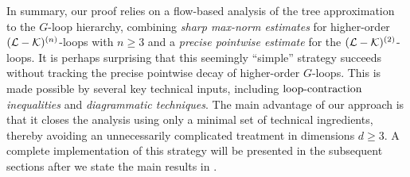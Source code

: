 In summary, our proof relies on a flow-based analysis of the tree approximation to the $G$-loop hierarchy, combining \emph{sharp max-norm estimates} for higher-order $(\mathcal L-\mathcal K)^{(n)}$-loops with $n\ge 3$ and a \emph{precise pointwise estimate} for the $(\mathcal L-\mathcal K)^{(2)}$-loops.
It is perhaps surprising that this seemingly ``simple'' strategy succeeds without tracking the precise pointwise decay of higher-order $G$-loops. This is made possible by several key technical inputs, including \emph{$\text{loop-contraction}$ inequalities} and \emph{diagrammatic techniques}.
The main advantage of our approach is that it closes the analysis using only a minimal set of technical ingredients, thereby avoiding an unnecessarily complicated treatment in dimensions $d\ge 3$.
A complete implementation of this strategy will be presented in the subsequent sections after we state the main results in .







